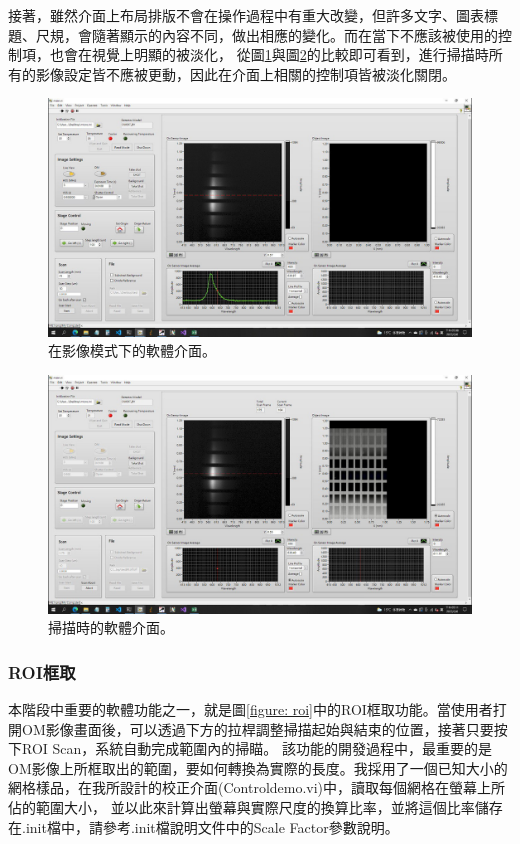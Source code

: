 \documentclass[12pt]{article}
\begin{document}
    接著，雖然介面上布局排版不會在操作過程中有重大改變，但許多文字、圖表標題、尺規，會隨著顯示的內容不同，做出相應的變化。而在當下不應該被使用的控制項，也會在視覺上明顯的被淡化，
    從圖\ref{figure: acquire mode}與圖\ref{figure: scanning}的比較即可看到，進行掃描時所有的影像設定皆不應被更動，因此在介面上相關的控制項皆被淡化關閉。
    \begin{figure}
        \centering
        \includegraphics[width=\linewidth]{acquire.jpeg}
        \caption{在影像模式下的軟體介面。}
        \label{figure: acquire mode}
    \end{figure}
    \begin{figure}
        \centering
        \includegraphics[width=\linewidth]{scanning.jpeg}
        \caption{掃描時的軟體介面。}
        \label{figure: scanning}
    \end{figure}
    \subsubsection{ROI框取}
    本階段中重要的軟體功能之一，就是圖\ref{figure: roi}中的ROI框取功能。當使用者打開OM影像畫面後，可以透過下方的拉桿調整掃描起始與結束的位置，接著只要按下ROI Scan，系統自動完成範圍內的掃瞄。
    該功能的開發過程中，最重要的是OM影像上所框取出的範圍，要如何轉換為實際的長度。我採用了一個已知大小的網格樣品，在我所設計的校正介面(Control\textunderscore demo.vi)中，讀取每個網格在螢幕上所佔的範圍大小，
    並以此來計算出螢幕與實際尺度的換算比率，並將這個比率儲存在.init檔中，請參考.init檔說明文件中的Scale Factor參數說明。
\end{document}
